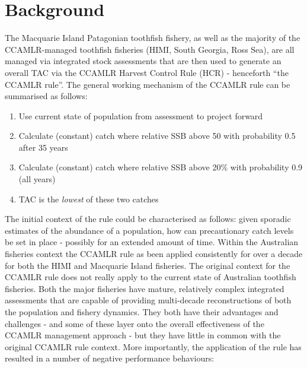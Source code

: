 \documentclass[12pt,a4paper,twoside,times,sky,standard]{csiroreport2017}
\begin{document}

\section{Background}

The Macquarie Island Patagonian toothfish fishery, as well as the majority of the CCAMLR-managed toothfish fisheries (HIMI, South Georgia, Ross Sea), are all managed via integrated stock assessments that are then used to generate an overall TAC via the CCAMLR Harvest Control Rule (HCR) - henceforth ``the CCAMLR rule''. The general working mechanism of the CCAMLR rule can be summarised as follows:

\begin{enumerate}
    \item Use current state of population from assessment to project forward
    \item Calculate (constant) catch where relative SSB above 50 with probability 0.5 after 35 years
    \item Calculate (constant) catch where relative SSB above 20\% with probability 0.9 (all years)
    \item TAC is the \emph{lowest} of these two catches
\end{enumerate}

The initial context of the rule could be characterised as follows: given sporadic estimates of the abundance of a population, how can precautionary catch levels be set in place - possibly for an extended amount of time. Within the Australian fisheries context the CCAMLR rule as been applied consistently for over a decade for both the HIMI and Macquarie Island fisheries. The original context for the CCAMLR rule does not really apply to the current state of Australian toothfish fisheries. Both the major fisheries have mature, relatively complex integrated assessments that are capable of providing multi-decade reconstructions of both the population and fishery dynamics. They both have their advantages and challenges - and some of these layer onto the overall effectiveness of the CCAMLR management approach - but they have little in common with the original CCAMLR rule context. More importantly, the application of the rule has resulted in a number of negative performance behaviours:
\end{document}
